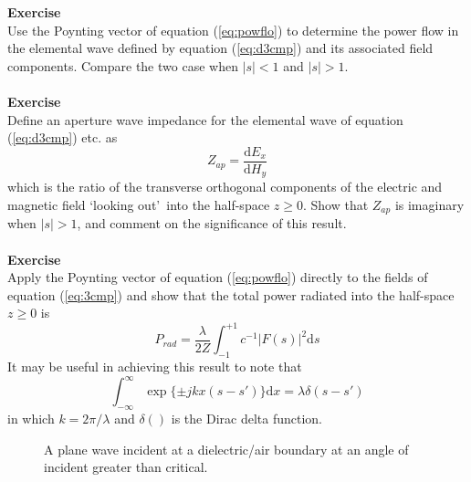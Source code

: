 \noindent \textbf{Exercise}\\
\noindent Use the Poynting vector of equation (\ref{eq:powflo}) to determine the power flow in the elemental wave defined by equation (\ref{eq:d3cmp}) and its associated field components. Compare the two case when $|s|<1$ and $|s|>1$.\\
\\
\noindent \textbf{Exercise}\\
\noindent Define an aperture wave impedance for the elemental wave of equation (\ref{eq:d3cmp}) etc. as
\begin{equation}
Z_{ap}=\dfrac{\mathrm{d}E_x}{\mathrm{d}H_y}
\end{equation}
which is the ratio of the transverse orthogonal components of the electric and magnetic field \textquoteleft looking out\textquoteright\ into the half-space $z\geqslant0$. Show that $Z_{ap}$ is imaginary when $|s|>1$, and comment on the significance of this result.\\
\\
\noindent \textbf{Exercise}\\
\noindent Apply the Poynting vector of equation (\ref{eq:powflo}) directly to the fields of equation (\ref{eq:3cmp}) and show that the total power radiated into the half-space $z\geqslant0$ is
\begin{equation}
P_{rad}=\dfrac{\lambda}{2Z}\int_{-1}^{+1}c^{-1}|F(s)|^2\mathrm{d}s
\end{equation}
It may be useful in achieving this result to note that
\begin{equation}
\int_{-\infty}^{\infty}\exp\{\pm jkx(s-s')\}\mathrm{d}x=\lambda\delta(s-s')
\end{equation}
in which $k=2\pi/\lambda$ and $\delta( )$ is the Dirac delta function.
\begin{figure}[htbp]
	\begin{center}
	\end{center}
	\caption{A plane wave incident at a dielectric/air boundary at an angle of incident greater than critical.}
	\label{fig:inc2die}
\end{figure}\\

